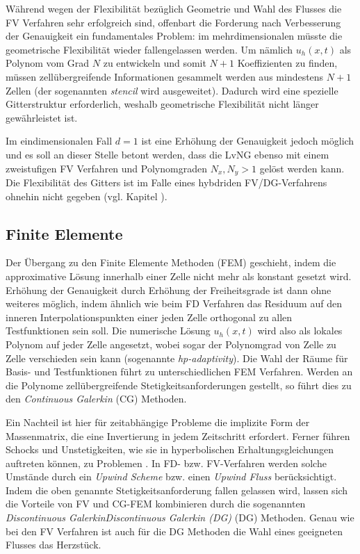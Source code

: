 Während wegen der Flexibilität bezüglich Geometrie und Wahl des Flusses die FV Verfahren sehr erfolgreich sind, offenbart die Forderung nach Verbesserung der Genauigkeit ein fundamentales Problem: im mehrdimensionalen müsste die geometrische Flexibilität wieder fallengelassen werden. Um nämlich $u_h(x,t)$ als Polynom vom Grad $N$ zu entwickeln und somit ${N+1}$ Koeffizienten zu finden, müssen zellübergreifende Informationen gesammelt werden aus mindestens ${N+1}$ Zellen (der sogenannten \emph{stencil} wird ausgeweitet). Dadurch wird eine spezielle Gitterstruktur erforderlich, weshalb geometrische Flexibilität nicht länger gewährleistet ist.

Im eindimensionalen Fall $d=1$ ist eine Erhöhung der Genauigkeit jedoch möglich und es soll an dieser Stelle betont werden, dass die LvNG ebenso mit einem zweistufigen FV Verfahren und Polynomgraden ${N_x,N_y > 1}$ gelöst werden kann. Die Flexibilität des Gitters ist im Falle eines hybdriden FV/DG-Verfahrens ohnehin nicht gegeben (vgl. Kapitel ).

\subsection{Finite Elemente}
Der Übergang zu den Finite Elemente Methoden (FEM) geschieht, indem die approximative Lösung innerhalb einer Zelle nicht mehr als konstant gesetzt wird. Erhöhung der Genauigkeit durch Erhöhung der Freiheitsgrade ist dann ohne weiteres möglich, indem ähnlich wie beim FD Verfahren das Residuum auf den inneren Interpolationspunkten einer jeden Zelle orthogonal zu allen Testfunktionen sein soll. Die numerische Lösung $u_h(x,t)$ wird also als lokales Polynom auf jeder Zelle angesetzt, wobei sogar der Polynomgrad von Zelle zu Zelle verschieden sein kann (sogenannte \emph{hp-adaptivity}). Die Wahl der Räume für Basis- und Testfunktionen führt zu unterschiedlichen FEM Verfahren. Werden an die Polynome zellübergreifende Stetigkeitsanforderungen gestellt, so führt dies zu den \emph{Continuous Galerkin} (CG) Methoden.

Ein Nachteil ist hier für zeitabhängige Probleme die implizite Form der Massenmatrix, die eine Invertierung in jedem Zeitschritt erfordert. Ferner führen Schocks und Unstetigkeiten, wie sie in hyperbolischen Erhaltungsgleichungen auftreten können, zu Problemen \cite{dolejvsi2015discontinuous}. In FD- bzw. FV-Verfahren werden solche Umstände durch ein \emph{Upwind Scheme} bzw. einen \emph{Upwind Fluss} berücksichtigt. Indem die oben genannte Stetigkeitsanforderung fallen gelassen wird, lassen sich die Vorteile von FV und CG-FEM kombinieren durch die sogenannten  \emph{Discontinuous Galerkin}\emph{Discontinuous Galerkin (DG)} (DG) Methoden. Genau wie bei den FV Verfahren ist auch für die DG Methoden die Wahl eines geeigneten Flusses das Herzstück.

